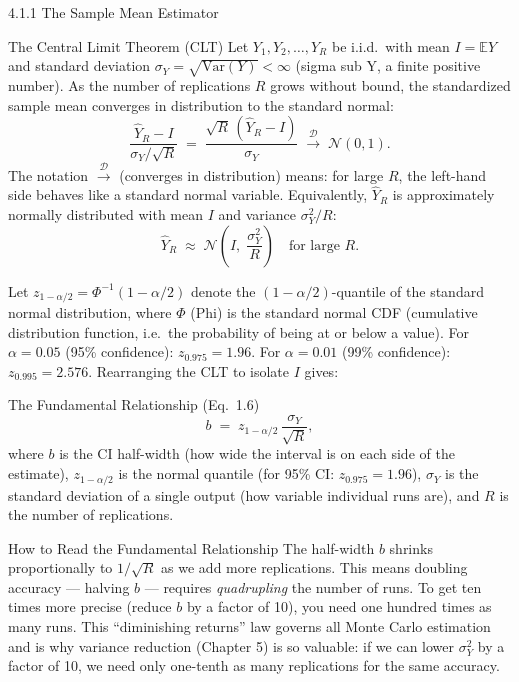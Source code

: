 \documentclass[aspectratio=169,10pt]{beamer}
\begin{document}
\begin{frame}[allowframebreaks]{4.1.1 The Sample Mean Estimator}
\begin{block}{The Central Limit Theorem (CLT)}
  Let $Y_1, Y_2, \ldots, Y_R$ be i.i.d.\ with mean $I = \mathbb{E}Y$
  and standard deviation $\sigma_Y = \sqrt{\mathrm{Var}(Y)} < \infty$
  (sigma sub Y, a finite positive number).  As the number of replications
  $R$ grows without bound, the standardized sample mean converges in
  distribution to the standard normal:
  \[
    \frac{\hat{Y}_R - I}{\sigma_Y / \sqrt{R}}
      \;=\;
    \frac{\sqrt{R}\,(\hat{Y}_R - I)}{\sigma_Y}
      \;\xrightarrow{\mathcal{D}}\;
      \mathcal{N}(0, 1).
  \]
  The notation $\xrightarrow{\mathcal{D}}$ (converges in distribution)
  means: for large $R$, the left-hand side behaves like a standard
  normal variable.  Equivalently, $\hat{Y}_R$ is approximately normally
  distributed with mean $I$ and variance $\sigma_Y^2 / R$:
  \[
    \hat{Y}_R \;\approx\; \mathcal{N}\!\left(I,\; \frac{\sigma_Y^2}{R}\right)
    \quad \text{for large } R.
  \]
\end{block}

Let $z_{1-\alpha/2} = \Phi^{-1}(1 - \alpha/2)$ denote the
$(1-\alpha/2)$-quantile of the standard normal distribution, where
$\Phi$ (Phi) is the standard normal CDF (cumulative distribution
function, i.e.\ the probability of being at or below a value).
For $\alpha = 0.05$ (95\% confidence): $z_{0.975} = 1.96$.
For $\alpha = 0.01$ (99\% confidence): $z_{0.995} = 2.576$.
Rearranging the CLT to isolate $I$ gives:

\begin{block}{The Fundamental Relationship (Eq.\ 1.6)}
  \[
    b \;=\; z_{1-\alpha/2}\,\frac{\sigma_Y}{\sqrt{R}},
    \tag{1.6}
  \]
  where $b$ is the CI half-width (how wide the interval is on each
  side of the estimate), $z_{1-\alpha/2}$ is the normal quantile
  (for 95\% CI: $z_{0.975} = 1.96$), $\sigma_Y$ is the standard
  deviation of a single output (how variable individual runs are),
  and $R$ is the number of replications.
\end{block}

\begin{alertblock}{How to Read the Fundamental Relationship}
  The half-width $b$ shrinks proportionally to $1/\sqrt{R}$ as we
  add more replications.  This means doubling accuracy --- halving
  $b$ --- requires \emph{quadrupling} the number of runs.  To get
  ten times more precise (reduce $b$ by a factor of 10), you need
  one hundred times as many runs.  This ``diminishing returns'' law
  governs all Monte Carlo estimation and is why variance reduction
  (Chapter 5) is so valuable: if we can lower $\sigma_Y^2$ by a
  factor of 10, we need only one-tenth as many replications for the
  same accuracy.
\end{alertblock}


\end{frame}
\end{document}
